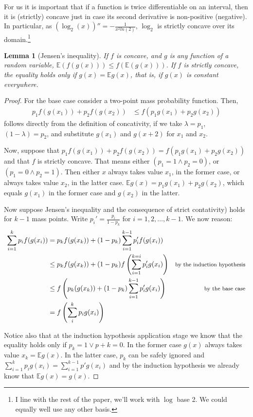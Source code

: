 \documentclass[
  letterpaper,
  DIV=11,
  numbers=noendperiod]{scrartcl}
\newtheorem{lemma}{Lemma}
\begin{document}
For us it is important that if a function is twice differentiable on an
interval, then it is (strictly) concave just in case its second
derivative is non-positive (negative). In particular, as
\((\log_2(x))'' = -\frac{1}{x^2 ln(2)}\), \(\log_2\) is strictly concave
over its
domain.\footnote{I line with the rest of the paper, we'll work with $\log$ base 2. We could equally well use any other basis.}

\begin{lemma}[Jensen's inequality]
If $f$ is concave, and $g$ is any function of a random variable, $\mathbb{E}(f(g(x))) \leq f(\mathbb{E}(g(x)))$. If $f$ is 
strictly concave, the equality holds only if $g(x) = \mathbb{E} g(x)$, that is, if $g(x)$ is constant everywhere.
\end{lemma}

\begin{proof}
For the base case consider a two-point mass probability function. Then,
\begin{align*}
p_1f(g(x_1))+ p_2f(g(x_2)) &\leq f(p_1g(x_1) + p_2g(x_2))
\end{align*}
\noindent follows directly from the definition of concativity, if we take $\lambda = p_1$, $(1-\lambda)=p_2$,
 and substitute $g(x_1)$ and $g(x+2)$ for $x_1$ and $x_2$.



Now, suppose that  $ p_1f(g(x_1))+ p_2f(g(x_2)) = f(p_1g(x_1) + p_2g(x_2))$ and that   $f$ is strictly concave.
 That means either $(p_1 = 1\wedge p_2 = 0)$, or $(p_1 = 0 \wedge p_2 =1)$. Then either $x$ always takes
  value $x_1$, in the former case, or always takes value $x_2$, in the latter
   case. $\mathbb{E} g (x) =  p_1 g(x_1) + p_2 g(x_2)$, which equals  $g(x_1)$ in the former case and $g(x_2)$ in the latter.


Now suppose Jensen's inequality and the consequence of strict contativity) holds for $k-1$ mass points. 
Write $p_i' = \frac{p_i}{1-p_k}$ for $i = 1, 2, \dots, k-1$. We now reason:
\begin{align*}
\sum_{i=1}^k p_i f(g(x_i)) & =
 p_kf(g(x_k)) + (1-p_k)\sum_{i =1}^{k-1}p_i'f(g(x_i)) &\\
 & \leq p_k f(g(x_k)) + (1-p_k)f\left( \sum_{i = 1}^{k=i}p_i' g(x_i) \right) & \mbox{\footnotesize by 
 the induction hypothesis}\\ &\leq f\left( p_k(g(x_k)) + (1-p_k)\sum_{i = 1}^{k-1} p_i' g(x_i)\right) & 
 \mbox{\footnotesize by the base case} \\
 & = f \left( \sum_{i}^k p_i g(x_i)\right)
 \end{align*}

Notice also that at the induction hypothesis application stage we know that the equality holds only if 
$p_k =1 \vee p+k = 0$. In the former case $g(x)$ always takes value $x_k = \mathbb{E} g(x)$. In the latter case,
 $p_k$ can be safely ignored and $\sum_{i=1}^{k}p_ig(x_i) = \sum_{i=1}^{k-1}p'g(x_i)$ and by the induction 
 hypothesis we already know that $\mathbb{E} g(x) = g(x)$.


\end{proof}
\end{document}

